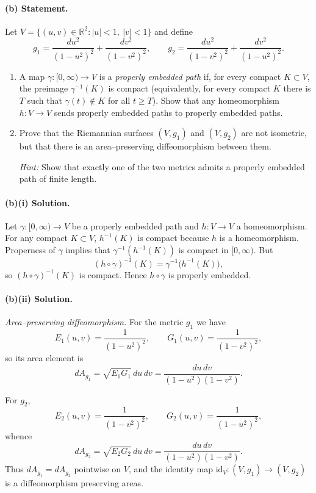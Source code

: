 \documentclass[12pt,a4paper]{article}
\theoremstyle{plain}
\theoremstyle{definition}      %
\begin{document}
	\bigskip
	\paragraph{(b) Statement.}
	Let $V=\{(u,v)\in\mathbb{R}^2: |u|<1,\ |v|<1\}$ and define
	\[
	g_1 = \frac{du^2}{(1-u^2)^2} + \frac{dv^2}{(1-v^2)^2},
	\qquad
	g_2 = \frac{du^2}{(1-v^2)^2} + \frac{dv^2}{(1-u^2)^2}.
	\]
	
	\begin{enumerate}
		\item A map $\gamma:[0,\infty)\to V$ is a \emph{properly embedded path} if, for every
		compact $K\subset V$, the preimage $\gamma^{-1}(K)$ is compact (equivalently,
		for every compact $K$ there is $T$ such that $\gamma(t)\notin K$ for all
		$t\ge T$). Show that any homeomorphism $h:V\to V$
		sends properly embedded paths to properly embedded paths.
		\item Prove that the Riemannian surfaces $(V,g_1)$ and $(V,g_2)$ are not isometric,
		but that there is an area–preserving diffeomorphism between them.
		
		\emph{Hint:} Show that exactly one of the two metrics admits a properly embedded
		path of finite length.
	\end{enumerate}
	
	\paragraph{(b)(i) Solution.}
	Let $\gamma:[0,\infty)\to V$ be a properly embedded path and $h:V\to V$ a homeomorphism.
	For any compact $K\subset V$, $h^{-1}(K)$ is compact because $h$ is a homeomorphism.
	Properness of $\gamma$ implies that $\gamma^{-1}(h^{-1}(K))$ is compact in $[0,\infty)$.
	But
	\[
	(h\circ\gamma)^{-1}(K) = \gamma^{-1}\bigl(h^{-1}(K)\bigr),
	\]
	so $(h\circ\gamma)^{-1}(K)$ is compact. Hence $h\circ\gamma$ is properly embedded.
	
	\paragraph{(b)(ii) Solution.}
	
	\emph{Area–preserving diffeomorphism.}
	For the metric $g_1$ we have
	\[
	E_1(u,v) = \frac{1}{(1-u^2)^2}, \qquad
	G_1(u,v) = \frac{1}{(1-v^2)^2},
	\]
	so its area element is
	\[
	dA_{g_1} = \sqrt{E_1 G_1}\,du\,dv
	= \frac{du\,dv}{(1-u^2)(1-v^2)}.
	\]
	
	For $g_2$,
	\[
	E_2(u,v) = \frac{1}{(1-v^2)^2}, \qquad
	G_2(u,v) = \frac{1}{(1-u^2)^2},
	\]
	whence
	\[
	dA_{g_2} = \sqrt{E_2 G_2}\,du\,dv
	= \frac{du\,dv}{(1-u^2)(1-v^2)}.
	\]
	Thus $dA_{g_1}=dA_{g_2}$ pointwise on $V$, and the identity map
	$\mathrm{id}_V:(V,g_1)\to(V,g_2)$ is a diffeomorphism preserving areas.
	
\end{document}
